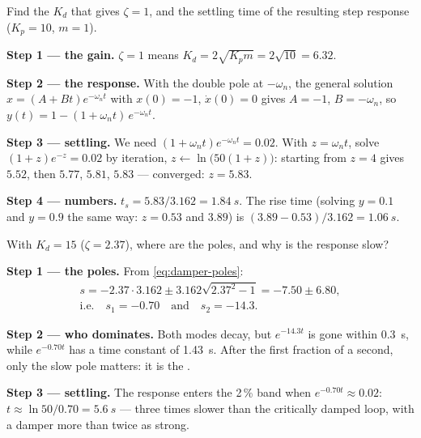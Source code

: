 \begin{example}
\label{ex:damper-crit}
Find the $K_d$ that gives $\zeta = 1$, and the settling time of the resulting step response ($K_p = 10$, $m = 1$).

\textbf{Step 1 — the gain.} $\zeta = 1$ means $K_d = 2\sqrt{K_p m} = 2\sqrt{10} = 6.32$.

\textbf{Step 2 — the response.} With the double pole at $-\omega_n$, the general solution $x = (A + Bt)e^{-\omega_n t}$ with $x(0) = -1$, $\dot x(0) = 0$ gives $A = -1$, $B = -\omega_n$, so
$y(t) = 1 - (1 + \omega_n t)\,e^{-\omega_n t}$.

\textbf{Step 3 — settling.} We need $(1 + \omega_n t)e^{-\omega_n t} = 0.02$. With $z = \omega_n t$, solve $(1+z)e^{-z} = 0.02$ by iteration, $z \leftarrow \ln\big(50(1+z)\big)$: starting from $z = 4$ gives $5.52$, then $5.77$, $5.81$, $5.83$ — converged: $z = 5.83$.

\textbf{Step 4 — numbers.} $t_s = 5.83/3.162 = \SI{1.84}{s}$. The rise time (solving $y = 0.1$ and $y = 0.9$ the same way: $z = 0.53$ and $3.89$) is $(3.89 - 0.53)/3.162 = \SI{1.06}{s}$.
\end{example}

\begin{example}
\label{ex:damper-over}
With $K_d = 15$ ($\zeta = 2.37$), where are the poles, and why is the response slow?

\textbf{Step 1 — the poles.} From \cref{eq:damper-poles}:
\begin{gather*}
  s = -2.37\cdot3.162 \pm 3.162\sqrt{2.37^2 - 1} = -7.50 \pm 6.80,\\
  \text{i.e.}\quad s_1 = -0.70 \quad\text{and}\quad s_2 = -14.3 .
\end{gather*}

\textbf{Step 2 — who dominates.} Both modes decay, but $e^{-14.3t}$ is gone within \SI{0.3}{s}, while $e^{-0.70t}$ has a time constant of \SI{1.43}{s}. After the first fraction of a second, only the slow pole matters: it is the .

\textbf{Step 3 — settling.} The response enters the 2\,\% band when $e^{-0.70t} \approx 0.02$: $t \approx \ln 50/0.70 = \SI{5.6}{s}$ — three times slower than the critically damped loop, with a damper more than twice as strong.
\end{example}

